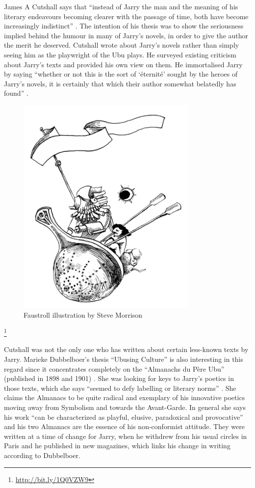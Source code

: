 James A Cutshall says that ``instead of Jarry the man and the meaning of his literary endeavours becoming clearer with the passage of time, both have become increasingly indistinct'' \autocite[p.246]{Cutshall1988}. The intention of his thesis was to show the seriousness implied behind the humour in many of Jarry's novels, in order to give the author the merit he deserved. Cutshall wrote about Jarry's novels rather than simply seeing him as the playwright of the Ubu plays. He surveyed existing criticism about Jarry's texts and provided his own view on them. He immortalised Jarry by saying ``whether or not this is the sort of `éternité' sought by the heroes of Jarry's novels, it is certainly that which their author somewhat belatedly has found'' \autocite[p.248]{Cutshall1988}.

\begin{figure}[htb]
  \centering
  \includegraphics[height=0.3\textheight]{images/faustroll}
  \caption[Faustroll]{Faustroll illustration by Steve Morrison}
\label{fig:FAUSTROLL}
\end{figure}\footnote{\url{http://bit.ly/1Q0VZW9}} %

Cutshall was not the only one who has written about certain less-known texts by Jarry. Marieke Dubbelboer's thesis ``Ubusing Culture'' is also interesting in this regard since it concentrates completely on the ``Almanachs du Père Ubu'' (published in 1898 and 1901) \autocite{Dubbelboer2009}. She was looking for keys to Jarry's poetics in those texts, which she says ``seemed to defy labelling or literary norms'' \autocite[p.10]{Dubbelboer2009}. She claims the Almanacs to be quite radical and exemplary of his innovative poetics moving away from Symbolism and towards the Avant-Garde. In general she says his work ``can be characterized as playful, elusive, paradoxical and provocative'' \autocite[p.197]{Dubbelboer2009} and his two Almanacs are the essence of his non-conformist attitude. They were written at a time of change for Jarry, when he withdrew from his usual circles in Paris and he published in new magazines, which links his change in writing according to Dubbelboer.

